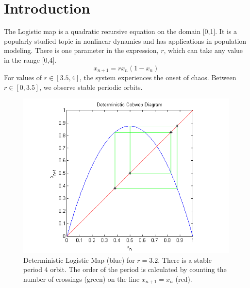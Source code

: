 \documentclass[12pt]{article}
\begin{document}
\section{Introduction}
\hspace{5mm}The Logistic map is a quadratic recursive equation on the domain
[0,1]. It is a popularly studied topic in nonlinear dynamics and has
applications in population modeling. There is one parameter in the
expression, $r$, which can take any value in the range [0,4]. 
\begin{equation*}
x_{n+1} = rx_n(1-x_n)
\end{equation*}
For values of $r \in [3.5,4]$, the system experiences the onset of
chaos. Between $r \in [0,3.5]$, we observe stable periodic orbits.
\begin{figure}[H]
	\begin{center}
		\includegraphics[scale=0.7]{det_cobweb}
\caption{Deterministic Logistic Map (blue) for $r=3.2$. There is a stable period
4 orbit. The order of the period is calculated by counting the number
of crossings (green) on the line $x_{n+1}=x_n$ (red).}
	\end{center}
\end{figure}
\end{document}

